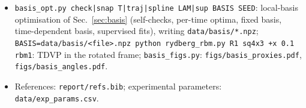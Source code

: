 \documentclass[11pt,a4paper]{article}
\begin{document}
\begin{itemize}
    the Part-II figures in \texttt{figs/} (\texttt{main} and \texttt{ansatz} also write the R1+G4 versions \texttt{*\_hl}).
  \item \texttt{basis\_opt.py check|snap T|traj|spline LAM|sup BASIS SEED}: local-basis optimisation of
    Sec.~\ref{sec:basis} (self-checks, per-time optima, fixed basis, time-dependent basis, supervised fits), writing
    \texttt{data/basis/*.npz}; \texttt{BASIS=data/basis/<file>.npz python rydberg\_rbm.py R1 sq4x3 +x 0.1 rbm1}: TDVP in
    the rotated frame; \texttt{basis\_figs.py}: \texttt{figs/basis\_proxies.pdf}, \texttt{figs/basis\_angles.pdf}.
  \item References: \texttt{report/refs.bib}; experimental parameters: \texttt{data/exp\_params.csv}.
\end{itemize}



\end{document}

